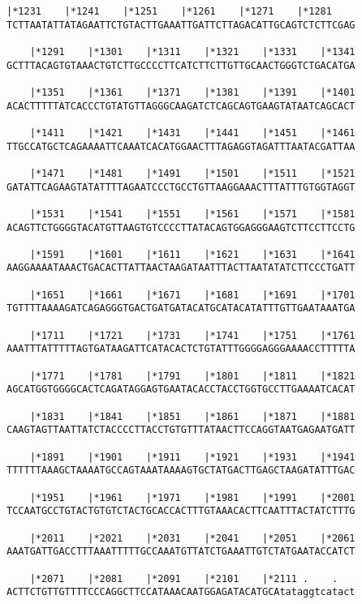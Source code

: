 \documentclass{article}
\begin{document}
\begin{Verbatim}[fontfamily=courier]
    |*1231    |*1241    |*1251    |*1261    |*1271    |*1281
TCTTAATATTATAGAATTCTGTACTTGAAATTGATTCTTAGACATTGCAGTCTCTTCGAG

    |*1291    |*1301    |*1311    |*1321    |*1331    |*1341
GCTTTACAGTGTAAACTGTCTTGCCCCTTCATCTTCTTGTTGCAACTGGGTCTGACATGA

    |*1351    |*1361    |*1371    |*1381    |*1391    |*1401
ACACTTTTTATCACCCTGTATGTTAGGGCAAGATCTCAGCAGTGAAGTATAATCAGCACT

    |*1411    |*1421    |*1431    |*1441    |*1451    |*1461
TTGCCATGCTCAGAAAATTCAAATCACATGGAACTTTAGAGGTAGATTTAATACGATTAA

    |*1471    |*1481    |*1491    |*1501    |*1511    |*1521
GATATTCAGAAGTATATTTTAGAATCCCTGCCTGTTAAGGAAACTTTATTTGTGGTAGGT

    |*1531    |*1541    |*1551    |*1561    |*1571    |*1581
ACAGTTCTGGGGTACATGTTAAGTGTCCCCTTATACAGTGGAGGGAAGTCTTCCTTCCTG

    |*1591    |*1601    |*1611    |*1621    |*1631    |*1641
AAGGAAAATAAACTGACACTTATTAACTAAGATAATTTACTTAATATATCTTCCCTGATT

    |*1651    |*1661    |*1671    |*1681    |*1691    |*1701
TGTTTTAAAAGATCAGAGGGTGACTGATGATACATGCATACATATTTGTTGAATAAATGA

    |*1711    |*1721    |*1731    |*1741    |*1751    |*1761
AAATTTATTTTTAGTGATAAGATTCATACACTCTGTATTTGGGGAGGGAAAACCTTTTTA

    |*1771    |*1781    |*1791    |*1801    |*1811    |*1821
AGCATGGTGGGGCACTCAGATAGGAGTGAATACACCTACCTGGTGCCTTGAAAATCACAT

    |*1831    |*1841    |*1851    |*1861    |*1871    |*1881
CAAGTAGTTAATTATCTACCCCTTACCTGTGTTTATAACTTCCAGGTAATGAGAATGATT

    |*1891    |*1901    |*1911    |*1921    |*1931    |*1941
TTTTTTAAAGCTAAAATGCCAGTAAATAAAAGTGCTATGACTTGAGCTAAGATATTTGAC

    |*1951    |*1961    |*1971    |*1981    |*1991    |*2001
TCCAATGCCTGTACTGTGTCTACTGCACCACTTTGTAAACACTTCAATTTACTATCTTTG

    |*2011    |*2021    |*2031    |*2041    |*2051    |*2061
AAATGATTGACCTTTAAATTTTTGCCAAATGTTATCTGAAATTGTCTATGAATACCATCT

    |*2071    |*2081    |*2091    |*2101    |*2111 .    .   
ACTTCTGTTGTTTTCCCAGGCTTCCATAAACAATGGAGATACATGCAtataggtcatact

\end{Verbatim}
\newpage
\end{document}
